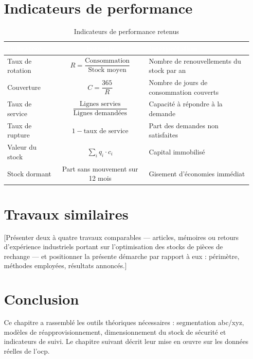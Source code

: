 \section{Indicateurs de performance}
\label{sec:kpi}

\begin{table}[H]
  \centering
  \caption{Indicateurs de performance retenus}
  \label{tab:kpis}
  \renewcommand{\arraystretch}{1.5}
  \begin{tabularx}{\textwidth}{|l|c|X|}
    \hline
    \rowcolor{iacsTableHead}
    \textcolor{white}{\textbf{Indicateur}} &
    \textcolor{white}{\textbf{Formule}} &
    \textcolor{white}{\textbf{Interprétation}} \\
    \hline
    Taux de rotation &
    $R = \dfrac{\text{Consommation}}{\text{Stock moyen}}$ &
    Nombre de renouvellements du stock par an \\
    \hline
    \rowcolor{iacsLightGray}
    Couverture &
    $C = \dfrac{365}{R}$ &
    Nombre de jours de consommation couverts \\
    \hline
    Taux de service &
    $\dfrac{\text{Lignes servies}}{\text{Lignes demandées}}$ &
    Capacité à répondre à la demande \\
    \hline
    \rowcolor{iacsLightGray}
    Taux de rupture &
    $1 - \text{taux de service}$ &
    Part des demandes non satisfaites \\
    \hline
    Valeur du stock &
    $\sum_{i} q_{i} \cdot c_{i}$ &
    Capital immobilisé \\
    \hline
    \rowcolor{iacsLightGray}
    Stock dormant &
    Part sans mouvement sur 12 mois &
    Gisement d'économies immédiat \\
    \hline
  \end{tabularx}
\end{table}

\section{Travaux similaires}
\label{sec:travaux_similaires}

\hspace{1cm}[Présenter deux à quatre travaux comparables — articles, mémoires ou
retours d'expérience industriels portant sur l'optimisation des stocks de pièces
de rechange — et positionner la présente démarche par rapport à eux : périmètre,
méthodes employées, résultats annoncés.]

\section*{Conclusion}

Ce chapitre a rassemblé les outils théoriques nécessaires : segmentation
\gls{abc}/\gls{xyz}, modèles de réapprovisionnement, dimensionnement du stock de
sécurité et indicateurs de suivi. Le chapitre suivant décrit leur mise en
\oe uvre sur les données réelles de l'\gls{ocp}.
